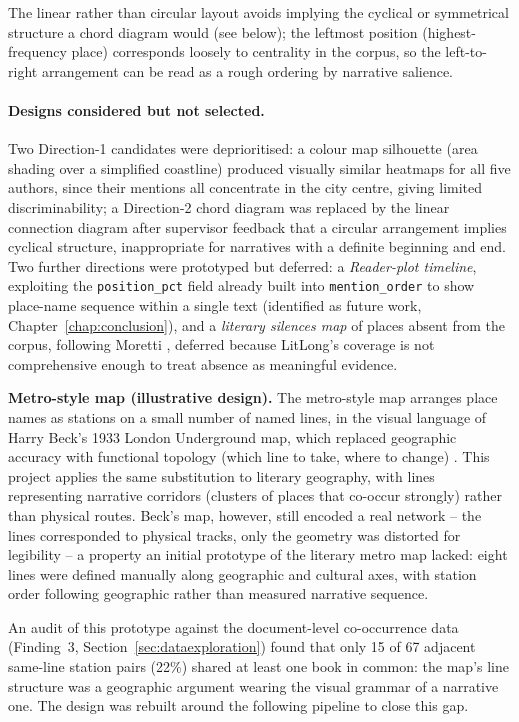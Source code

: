 \documentclass[logo,msc]{infthesis}
\begin{document}
The linear rather than circular layout avoids implying the cyclical or symmetrical structure a chord diagram would (see below); the leftmost position (highest-frequency place) corresponds loosely to centrality in the corpus, so the left-to-right arrangement can be read as a rough ordering by narrative salience.

\paragraph*{Designs considered but not selected.} Two Direction-1 candidates were deprioritised: a colour map silhouette (area shading over a simplified coastline) produced visually similar heatmaps for all five authors, since their mentions all concentrate in the city centre, giving limited discriminability; a Direction-2 chord diagram was replaced by the linear connection diagram after supervisor feedback that a circular arrangement implies cyclical structure, inappropriate for narratives with a definite beginning and end. Two further directions were prototyped but deferred: a \emph{Reader-plot timeline}, exploiting the \texttt{position\_pct} field already built into \texttt{mention\_order} to show place-name sequence within a single text (identified as future work, Chapter~\ref{chap:conclusion}), and a \emph{literary silences map} of places absent from the corpus, following Moretti \cite{moretti2005}, deferred because LitLong's coverage is not comprehensive enough to treat absence as meaningful evidence.
 
\textbf{Metro-style map (illustrative design).} The metro-style map arranges place names as stations on a small number of named lines, in the visual language of Harry Beck's 1933 London Underground map, which replaced geographic accuracy with functional topology (which line to take, where to change) \cite{beck1933}. This project applies the same substitution to literary geography, with lines representing narrative corridors (clusters of places that co-occur strongly) rather than physical routes. Beck's map, however, still encoded a real network -- the lines corresponded to physical tracks, only the geometry was distorted for legibility -- a property an initial prototype of the literary metro map lacked: eight lines were defined manually along geographic and cultural axes, with station order following geographic rather than measured narrative sequence.

An audit of this prototype against the document-level co-occurrence data (Finding~3, Section~\ref{sec:dataexploration}) found that only 15 of 67 adjacent same-line station pairs (22\%) shared at least one book in common: the map's line structure was a geographic argument wearing the visual grammar of a narrative one. The design was rebuilt around the following pipeline to close this gap.
\end{document}

